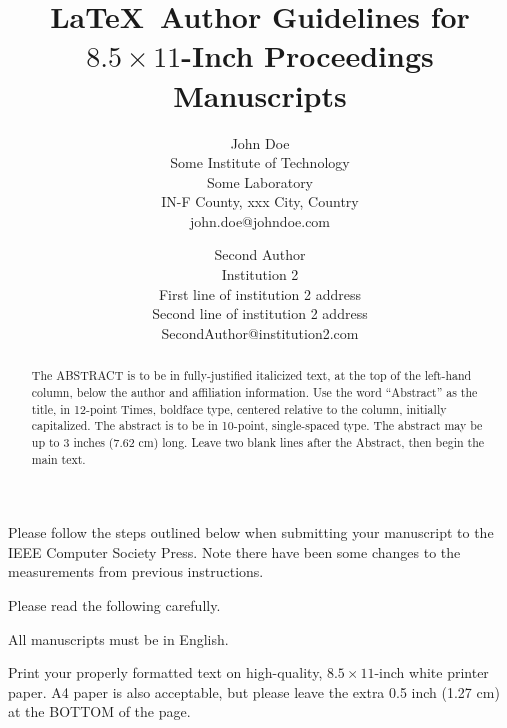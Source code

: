 \documentclass[times, 10pt,twocolumn]{article}
\begin{document}
	\title{\LaTeX\ Author Guidelines for {\boldmath $8.5 \times 11$-Inch} Proceedings Manuscripts}

	\author{John Doe\\
		Some Institute of Technology\\ Some Laboratory \\ IN-F
		County, xxx City, Country\\ john.doe@johndoe.com\\
		\and
		Second Author\\
		Institution 2\\
		First line of institution 2 address\\ Second line of institution 2 address\\
		SecondAuthor@institution2.com\\
	}

	\maketitle
	\thispagestyle{empty}

	\begin{abstract}
	   The ABSTRACT is to be in fully-justified italicized text, at the top
	   of the left-hand column, below the author and affiliation
	   information. Use the word ``Abstract'' as the title, in 12-point
	   Times, boldface type, centered relative to the column, initially
	   capitalized. The abstract is to be in 10-point, single-spaced type.
	   The abstract may be up to 3 inches (7.62 cm) long. Leave two blank
	   lines after the Abstract, then begin the main text.
	\end{abstract}


	Please follow the steps outlined below when submitting your
	manuscript to the IEEE Computer Society Press. Note there have
	been some changes to the measurements from previous instructions.


	Please read the following carefully.


	All manuscripts must be in English.


	Print your properly formatted text on high-quality, $8.5 \times 11$-inch
	white printer paper. A4 paper is also acceptable, but please leave the
	extra 0.5 inch (1.27 cm) at the BOTTOM of the page.
\end{document}
